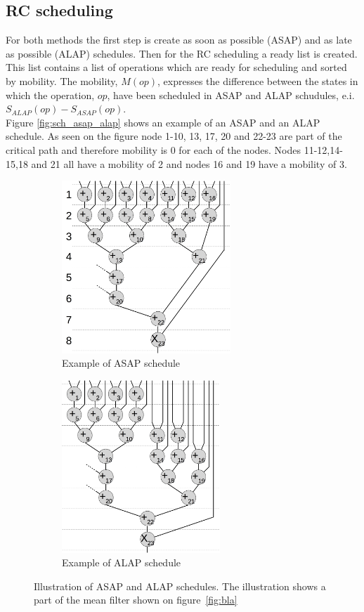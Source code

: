 \subsection{RC scheduling}
For both methods the first step is create as soon as possible (ASAP) and as late as possible (ALAP) schedules. Then for the RC scheduling a ready list is created. This list contains a list of operations which are ready for scheduling and sorted by mobility. The mobility, $M(op)$, expresses the difference between the states in which the operation, $op$, have been scheduled in ASAP and ALAP schudules, e.i. $S_{ALAP}(op) - S_{ASAP}(op)$. \\
Figure \vref{fig:sch_asap_alap} shows an example of an ASAP and an ALAP schedule. As seen on the figure node 1-10, 13, 17, 20 and 22-23 are part of the critical path and therefore mobility is 0 for each of the nodes. Nodes 11-12,14-15,18 and 21 all have a mobility of 2 and nodes 16 and 19 have a mobility of 3. \\
\begin{figure}[ht]
  \centering
  \begin{subfigure}[t]{0.45\textwidth}
    \centering\includegraphics[height=6.5cm]{figures/sch_mfilt_asap.jpg}
    \caption{Example of ASAP schedule\label{fig:sch_asap}}
  \end{subfigure}\hspace{0.5cm}
  \begin{subfigure}[t]{0.45\textwidth}
    \centering\includegraphics[height=6.5cm]{figures/sch_mfilt_alap.jpg}
    \caption{Example of ALAP schedule\label{fig:sch_alap}}
  \end{subfigure}
  \caption{Illustration of ASAP and ALAP schedules. The illustration shows a part of the mean filter shown on figure~\vref{fig:bla} \label{fig:sch_asap_alap}}
\end{figure}

